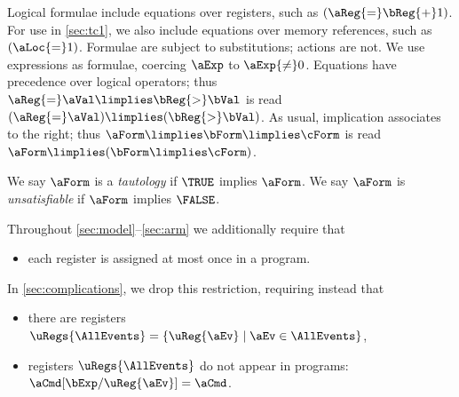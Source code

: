 Logical formulae include equations over registers, such as
$(\aReg{=}\bReg{+}1)$.
For use in \textsection\ref{sec:tc1}, we also include equations over memory references, such as $(\aLoc{=}1)$.
Formulae are subject to substitutions; %
actions are not.
We use expressions as formulae, coercing $\aExp$ to $\aExp{\neq}0$.
Equations have precedence over logical operators; thus
$\aReg{=}\aVal\limplies\bReg{>}\bVal$ is read
$(\aReg{=}\aVal)\limplies(\bReg{>}\bVal)$.  As usual, implication associates to the
right; thus $\aForm\limplies\bForm\limplies\cForm$ is read
$\aForm\limplies(\bForm\limplies\cForm)$.

We say
$\aForm$ is a \emph{tautology} if $\TRUE$ implies $\aForm$.
We say
$\aForm$ is \emph{unsatisfiable} if $\aForm$ implies $\FALSE$.


Throughout \textsection\ref{sec:model}--\ref{sec:arm} we 
additionally require that
\begin{itemize}
\item each register is assigned at most once in a program.
\end{itemize}
In \textsection\ref{sec:complications}, we drop this restriction, requiring
instead that
\begin{itemize}
\item there are registers
  $\uRegs{\AllEvents}=\{\uReg{\aEv}\mid\aEv\in\AllEvents\}$,
\item registers $\uRegs{\AllEvents}$ do not appear in programs: $\aCmd[\bExp/\uReg{\aEv}]=\aCmd$.
\end{itemize}


